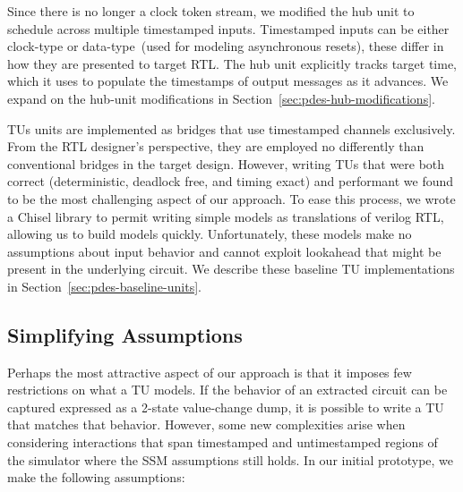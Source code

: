 Since there is no longer a clock token stream, we modified the hub unit to
schedule across multiple timestamped inputs. Timestamped inputs can be either
clock-type or data-type~(used for modeling asynchronous resets), these differ
in how they are presented to target RTL. The hub unit explicitly tracks target
time, which it uses to populate the timestamps of output messages as it advances.
We expand on the hub-unit modifications in Section~\ref{sec:pdes-hub-modifications}.

TUs units are implemented as bridges that use timestamped channels
exclusively. From the RTL designer's perspective, they are employed no
differently than conventional bridges in the target design.  However, writing
TUs that were both correct (deterministic, deadlock free, and
timing exact) and performant we found to be the most challenging aspect of our
approach.  To ease this process, we wrote a Chisel library to permit writing
simple models as translations of verilog RTL, allowing us to build models
quickly. Unfortunately, these models make no assumptions about input behavior
and cannot exploit lookahead that might be present in the underlying circuit. We 
describe these baseline TU implementations in Section~\ref{sec:pdes-baseline-units}.

\subsection{Simplifying Assumptions}\label{sec:pdes-assumptions}

Perhaps the most attractive aspect of our approach is that it imposes few
restrictions on what a TU models. If the behavior of an extracted circuit can
be captured expressed as a 2-state value-change dump, it is possible to write a
TU that matches that behavior. However, some new complexities arise when
considering interactions that span timestamped and untimestamped regions of the
simulator where the SSM assumptions still holds. In our initial prototype, we
make the following assumptions:

